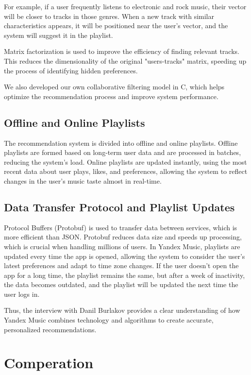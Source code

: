 \documentclass[12pt,a4paper]{article}
\begin{document}
For example, if a user frequently listens to electronic and rock music, their vector will be closer to tracks in those genres. When a new track with similar characteristics appears, it will be positioned near the user’s vector, and the system will suggest it in the playlist.

Matrix factorization is used to improve the efficiency of finding relevant tracks. This reduces the dimensionality of the original "users-tracks" matrix, speeding up the process of identifying hidden preferences.

We also developed our own collaborative filtering model in C, which helps optimize the recommendation process and improve system performance.

\subsection{Offline and Online Playlists}

The recommendation system is divided into offline and online playlists. Offline playlists are formed based on long-term user data and are processed in batches, reducing the system’s load. Online playlists are updated instantly, using the most recent data about user plays, likes, and preferences, allowing the system to reflect changes in the user's music taste almost in real-time.

\subsection{Data Transfer Protocol and Playlist Updates}

Protocol Buffers (Protobuf) is used to transfer data between services, which is more efficient than JSON. Protobuf reduces data size and speeds up processing, which is crucial when handling millions of users. In Yandex Music, playlists are updated every time the app is opened, allowing the system to consider the user’s latest preferences and adapt to time zone changes. If the user doesn't open the app for a long time, the playlist remains the same, but after a week of inactivity, the data becomes outdated, and the playlist will be updated the next time the user logs in.

Thus, the interview with Danil Burlakov provides a clear understanding of how Yandex Music combines technology and algorithms to create accurate, personalized recommendations.

\section{Comperation}
\end{document}
